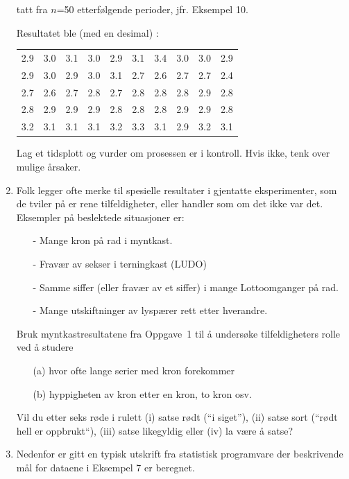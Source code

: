 \begin{enumerate}
tatt fra $n$=50 etterfølgende perioder, jfr. Eksempel 10.

Resultatet ble (med en desimal) :

\begin{center}
\begin{tabular}{cccccccccc}

2.9&3.0&3.1&3.0&2.9&3.1&3.4&3.0&3.0&2.9 \\
2.9&3.0&2.9&3.0&3.1&2.7&2.6&2.7&2.7&2.4 \\
2.7&2.6&2.7&2.8&2.7&2.8&2.8&2.8&2.9&2.8 \\
2.8&2.9&2.9&2.9&2.8&2.8&2.8&2.9&2.9&2.8 \\
3.2&3.1&3.1&3.1&3.2&3.3&3.1&2.9&3.2&3.1 \\
\end{tabular}
\end{center}
Lag et tidsplott og vurder om prosessen er i kontroll.  Hvis ikke, tenk over
mulige årsaker.
\item
Folk legger ofte merke til spesielle resultater i gjentatte eksperimenter,
som de tviler på er rene tilfeldigheter, eller handler som om det ikke
var det.  Eksempler på beslektede situasjoner er:

\begin{itemize}
\item[-]   Mange kron på rad i myntkast.
\item[-]   Fravær av sekser i terningkast (LUDO)
\item[-]   Samme siffer (eller fravær av et siffer) i mange Lottoomganger
           på rad.
\item[-]   Mange utskiftninger av lyspærer rett etter hverandre.
\end{itemize}

Bruk myntkastresultatene fra Oppgave~1 til å undersøke 
tilfeldigheters rolle ved å studere

\begin{itemize}
\item [(a)] hvor ofte lange serier med kron forekommer
\item [(b)] hyppigheten av kron etter en kron, to kron osv.
\end{itemize}



Vil du etter seks røde i rulett (i) satse rødt (``i siget''),
(ii) satse sort (``rødt hell er oppbrukt``), (iii) satse likegyldig eller
(iv) la være å satse?

\item
Nedenfor er gitt en typisk utskrift fra statistisk programvare der beskrivende
mål for dataene i Eksempel 7 er beregnet.
\begin{center} \framebox[10cm]{\begin{minipage}{9cm}\rule[-0.5cm]{0cm}{0.5cm}
\tt 


\end{minipage}}
\end{center}
\end{enumerate}
